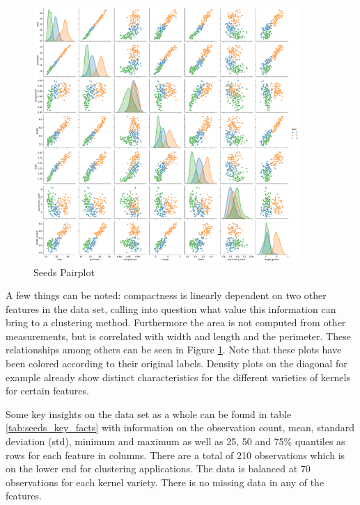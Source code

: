 \begin{figure}[H]
%
\begin{center}
\includegraphics[width=0.9\textwidth]{images/seeds_pairplot.pdf}
\end{center}
\caption{Seeds Pairplot}
\label{fig:seeds_pairplot}
\end{figure}

\vspace{-0.5cm}
A few things can be noted: compactness is linearly dependent on two other features in the data set, calling into question what value this information can bring to a clustering method. Furthermore the area is not computed from other measurements, but is correlated with width and length and the perimeter. These relationships among others can be seen in Figure \ref{fig:seeds_pairplot}. Note that these plots have been colored according to their original labels. Density plots on the diagonal for example already show distinct characteristics for the different varieties of kernels for certain features. 

Some key insights on the data set as a whole can be found in table \ref{tab:seeds_key_facts} with information on the observation count, mean, standard deviation (std), minimum and maximum as well as 25, 50 and 75\% quantiles as rows for each feature in columns. There are a total of 210 observations which is on the lower end for clustering applications. The data is balanced at 70 observations for each kernel variety. There is no missing data in any of the features.


